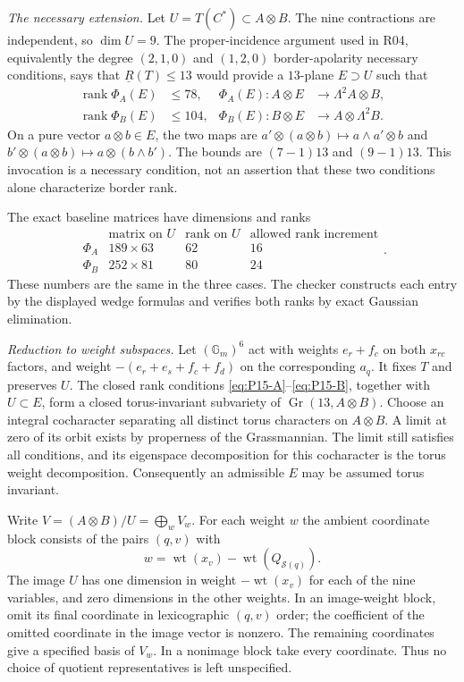 \emph{The necessary extension.}
Let $U=T(C^*)\subset A\otimes B$.  The nine contractions are independent,
so $\dim U=9$.  The proper-incidence argument used in R04, equivalently
the degree $(2,1,0)$ and $(1,2,0)$ border-apolarity necessary conditions,
says that $\underline R(T)\le13$ would provide a $13$-plane
$E\supset U$ such that
\begin{align}
 \operatorname{rank}\Phi_A(E)&\le78,&
 \Phi_A(E):A\otimes E&\longrightarrow\Lambda^2A\otimes B,\label{eq:P15-A}\\
 \operatorname{rank}\Phi_B(E)&\le104,&
 \Phi_B(E):B\otimes E&\longrightarrow A\otimes\Lambda^2B.\label{eq:P15-B}
\end{align}
On a pure vector $a\otimes b\in E$, the two maps are
$a'\otimes(a\otimes b)\mapsto a\wedge a'\otimes b$ and
$b'\otimes(a\otimes b)\mapsto a\otimes(b\wedge b')$.
The bounds are $(7-1)13$ and $(9-1)13$.
This invocation is a necessary condition, not an assertion that these two
conditions alone characterize border rank.

The exact baseline matrices have dimensions and ranks
\[
\begin{array}{c|c|c|c}
 &\text{matrix on }U&\text{rank on }U&\text{allowed rank increment}\\\hline
 \Phi_A&189\times63&62&16\\
 \Phi_B&252\times81&80&24
\end{array}.
\]
These numbers are the same in the three cases.  The checker constructs
each entry by the displayed wedge formulas and verifies both ranks by
exact Gaussian elimination.

\emph{Reduction to weight subspaces.}
Let $(\mathbb G_m)^6$ act with weights $e_r+f_c$ on both $x_{rc}$ factors,
and weight $-(e_r+e_s+f_c+f_d)$ on the corresponding $a_q$.
It fixes $T$ and preserves $U$.  The closed rank conditions
\eqref{eq:P15-A}--\eqref{eq:P15-B}, together with $U\subset E$, form a
closed torus-invariant subvariety of $\operatorname{Gr}(13,A\otimes B)$.
Choose an integral cocharacter separating all distinct torus characters
on $A\otimes B$.  A limit at zero of its orbit exists by properness of
the Grassmannian.  The limit still satisfies all conditions, and its
eigenspace decomposition for this cocharacter is the torus weight
decomposition.  Consequently an admissible $E$ may be assumed torus
invariant.

Write $V=(A\otimes B)/U=\bigoplus_wV_w$.  For each weight $w$ the
ambient coordinate block consists of the pairs $(q,v)$ with
\[
 w=\operatorname{wt}(x_v)-\operatorname{wt}(Q_{\mathcal S(q)}).
\]
The image $U$ has one dimension in weight $-\operatorname{wt}(x_v)$ for
each of the nine variables, and zero dimensions in the other weights.
In an image-weight block, omit its final coordinate in lexicographic
$(q,v)$ order; the coefficient of the omitted coordinate in the image
vector is nonzero.  The remaining coordinates give a specified basis of
$V_w$.  In a nonimage block take every coordinate.  Thus no choice of
quotient representatives is left unspecified.

